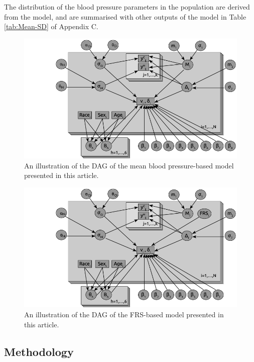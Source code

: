 \documentclass[
]{article}
\begin{document}
The distribution of the blood pressure parameters in the population are derived from the model, and are summarised with other outputs of the model in Table \ref{tab:Mean-SD} of Appendix C.

\begin{figure}
\hypertarget{fig:DAGmean}{%
\centering
\includegraphics{./DAG_Mean2.png}
\caption{An illustration of the DAG of the mean blood pressure-based model presented in this article.}\label{fig:DAGmean}
}
\end{figure}

\begin{figure}
\hypertarget{fig:DAGFRS}{%
\centering
\includegraphics{./DAG_FRS2.png}
\caption{An illustration of the DAG of the FRS-based model presented in this article.}\label{fig:DAGFRS}
}
\end{figure}

\hypertarget{methodology}{%
\subsection{Methodology}\label{methodology}}
\end{document}
